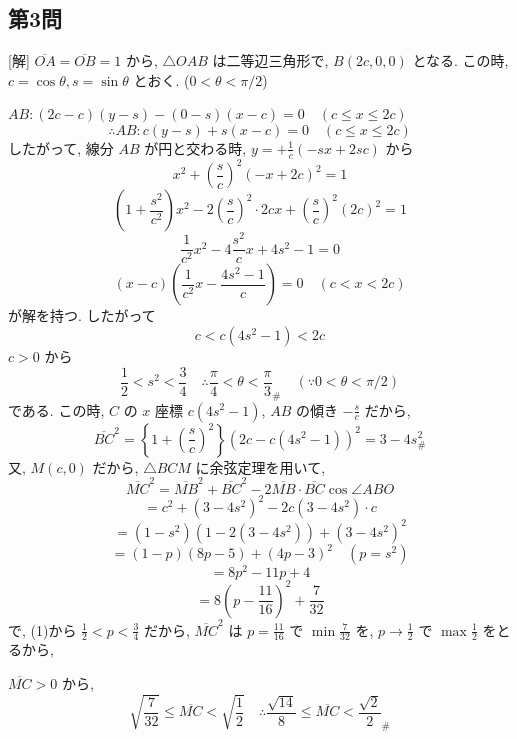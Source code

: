 \documentclass[../main.tex]{subfiles}
\begin{document}
\subsection*{第3問}

[解] $\overline{OA} = \overline{OB} = 1$ から, $\triangle OAB$ は二等辺三角形で, $B(2c, 0, 0)$ となる. この時, $c = \cos\theta, s = \sin\theta$ とおく. ($0 < \theta < \pi/2$)

$AB: (2c-c)(y-s) - (0-s)(x-c) = 0 \quad (c \le x \le 2c)$
\[
  \therefore AB: c(y-s) + s(x-c) = 0 \quad (c \le x \le 2c)
\]
したがって, 線分 $AB$ が円と交わる時, $y = +\frac{1}{c}(-sx + 2sc)$ から
\[
  x^2 + \left(\frac{s}{c}\right)^2 (-x+2c)^2 = 1
\]
\[
  \left(1 + \frac{s^2}{c^2}\right)x^2 - 2\left(\frac{s}{c}\right)^2 \cdot 2cx + \left(\frac{s}{c}\right)^2 (2c)^2 = 1
\]
\[
  \frac{1}{c^2}x^2 - 4\frac{s^2}{c}x + 4s^2 - 1 = 0
\]
\[
  (x-c)\left(\frac{1}{c^2}x - \frac{4s^2-1}{c}\right) = 0 \quad (c < x < 2c)
\]
が解を持つ. したがって
\[
  c < c(4s^2-1) < 2c
\]
$c > 0$ から
\[
  \frac{1}{2} < s^2 < \frac{3}{4} \quad \therefore \frac{\pi}{4} < \theta < \frac{\pi}{3}_{\text{\#}} \quad (\because 0 < \theta < \pi/2)
\]
である. この時, $C$ の $x$ 座標 $c(4s^2-1)$, $AB$ の傾き $-\frac{s}{c}$ だから,
\[
  \overline{BC}^2 = \left\{1+\left(\frac{s}{c}\right)^2\right\}\left(2c - c(4s^2-1)\right)^2 = 3 - 4s^2_{\text{\#}}
\]
又, $M(c, 0)$ だから, $\triangle BCM$ に余弦定理を用いて,
\[
  \overline{MC}^2 = \overline{MB}^2 + \overline{BC}^2 - 2\overline{MB}\cdot\overline{BC}\cos\angle ABO
\]
\[
  = c^2 + (3-4s^2)^2 - 2c(3-4s^2)\cdot c
\]
\[
  = (1-s^2)(1 - 2(3-4s^2)) + (3-4s^2)^2
\]
\[
  = (1-p)(8p-5) + (4p-3)^2 \quad (p = s^2)
\]
\[
  = 8p^2 - 11p + 4
\]
\[
  = 8\left(p - \frac{11}{16}\right)^2 + \frac{7}{32}
\]
で, (1)から $\frac{1}{2} < p < \frac{3}{4}$ だから, $\overline{MC}^2$ は $p = \frac{11}{16}$ で $\min \frac{7}{32}$ を, $p \to \frac{1}{2}$ で $\max \frac{1}{2}$ をとるから,

$\overline{MC} > 0$ から,
\[
  \sqrt{\frac{7}{32}} \le \overline{MC} < \sqrt{\frac{1}{2}} \quad \therefore \frac{\sqrt{14}}{8} \le \overline{MC} < \frac{\sqrt{2}}{2}_{\text{\#}}
\]
\end{document}
